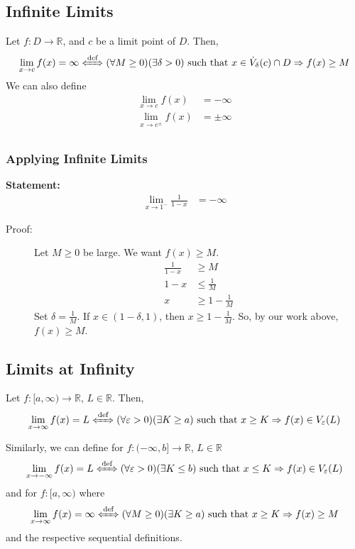\documentclass[10pt]{extarticle}
\newcommand{\R}{\mathbb{R}}
\begin{document}
  \subsection{Infinite Limits}%
    Let $f: D\rightarrow \R$, and $c$ be a limit point of $D$. Then,
    \begin{align*}
      \lim_{x\rightarrow c}f(x) = \infty \xLeftrightarrow{\text{def}} (\forall M \geq 0)(\exists \delta > 0) \text{ such that } x\in \dot{V}_{\delta}(c)\cap D \Rightarrow f(x) \geq M
    \end{align*}
    We can also define
    \begin{align*}
      \lim_{x\rightarrow c}f(x) &= -\infty\\
      \lim_{x\rightarrow c^{\pm}}f(x) &= \pm \infty\\
    \end{align*}
    \subsubsection{Applying Infinite Limits}%
    \textbf{Statement:} \begin{align*}
      \lim_{x\rightarrow 1^{-}}\frac{1}{1-x} &= -\infty
    \end{align*}
    \begin{description}
      \item[Proof:] Let $M\geq 0$ be large. We want $f(x) \geq M$.
        \begin{align*}
          \frac{1}{1-x} &\geq M\\
          1-x &\leq \frac{1}{M}\\
          x &\geq 1-\frac{1}{M}
        \end{align*}
        Set $\delta = \frac{1}{M}$. If $x\in (1-\delta,1)$, then $x\geq 1-\frac{1}{M}$. So, by our work above, $f(x) \geq M$.
    \end{description}
  \subsection{Limits at Infinity}%
    Let $f: [a,\infty) \rightarrow \R$, $L\in\R$. Then,
    \begin{align*}
      \lim_{x\rightarrow \infty}f(x) = L \xLeftrightarrow{\text{def}} (\forall \varepsilon > 0)(\exists K \geq a) \text{ such that } x\geq K \Rightarrow f(x)\in V_{\varepsilon}(L)
    \end{align*}

    Similarly, we can define for $f: (-\infty,b] \rightarrow \R$, $L\in \R$
    \begin{align*}
      \lim_{x\rightarrow -\infty} f(x) = L \xLeftrightarrow{\text{def}} (\forall \varepsilon > 0)(\exists K\leq b) \text{ such that } x\leq K \Rightarrow f(x)\in V_{\varepsilon}(L)
    \end{align*}
    and for $f: [a,\infty)$ where
    \begin{align*}
      \lim_{x\rightarrow\infty}f(x) = \infty \xLeftrightarrow{\text{def}} (\forall M \geq 0)(\exists K\geq a) \text{ such that } x\geq K \Rightarrow f(x) \geq M
    \end{align*}
    and the respective sequential definitions.
\end{document}
